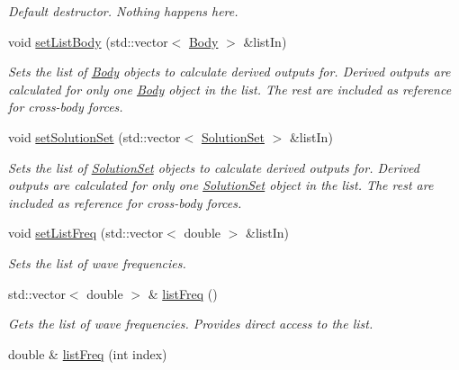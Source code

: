 \begin{DoxyCompactItemize}
\begin{DoxyCompactList}\small\item\em Default destructor. Nothing happens here. \end{DoxyCompactList}\item 
void \hyperlink{classosea_1_1ofreq_1_1_outputs_body_affe1a6cc1e310a6b84edec3804340354}{set\-List\-Body} (std\-::vector$<$ \hyperlink{classosea_1_1ofreq_1_1_body}{Body} $>$ \&list\-In)
\begin{DoxyCompactList}\small\item\em Sets the list of \hyperlink{classosea_1_1ofreq_1_1_body}{Body} objects to calculate derived outputs for. Derived outputs are calculated for only one \hyperlink{classosea_1_1ofreq_1_1_body}{Body} object in the list. The rest are included as reference for cross-\/body forces. \end{DoxyCompactList}\item 
void \hyperlink{classosea_1_1ofreq_1_1_outputs_body_a9d77d0704823b360ce4f6e8203203d51}{set\-Solution\-Set} (std\-::vector$<$ \hyperlink{classosea_1_1ofreq_1_1_solution_set}{Solution\-Set} $>$ \&list\-In)
\begin{DoxyCompactList}\small\item\em Sets the list of \hyperlink{classosea_1_1ofreq_1_1_solution_set}{Solution\-Set} objects to calculate derived outputs for. Derived outputs are calculated for only one \hyperlink{classosea_1_1ofreq_1_1_solution_set}{Solution\-Set} object in the list. The rest are included as reference for cross-\/body forces. \end{DoxyCompactList}\item 
void \hyperlink{classosea_1_1ofreq_1_1_outputs_body_a66e80853f6e8cad402a67c45502d0f03}{set\-List\-Freq} (std\-::vector$<$ double $>$ \&list\-In)
\begin{DoxyCompactList}\small\item\em Sets the list of wave frequencies. \end{DoxyCompactList}\item 
std\-::vector$<$ double $>$ \& \hyperlink{classosea_1_1ofreq_1_1_outputs_body_a6b28621ef475c1d917270e2259e1629f}{list\-Freq} ()
\begin{DoxyCompactList}\small\item\em Gets the list of wave frequencies. Provides direct access to the list. \end{DoxyCompactList}\item 
double \& \hyperlink{classosea_1_1ofreq_1_1_outputs_body_aea5ac6ef687c5dc979817b967bc9dfe2}{list\-Freq} (int index)

\end{DoxyCompactItemize}
